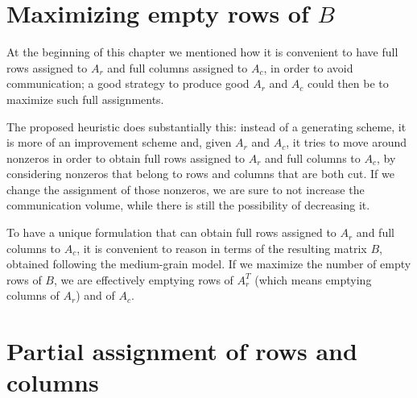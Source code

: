 \section{Maximizing empty rows of $B$} \label{sec:globalview}

At the beginning of this chapter we mentioned how it is convenient to have full rows assigned to $A_r$ and full columns assigned to $A_c$, in order to avoid communication; a good strategy to produce good $A_r$ and $A_c$ could then be to maximize such full assignments.

The proposed heuristic does substantially this: instead of a generating scheme, it is more of an improvement scheme and, given $A_r$ and $A_c$, it tries to move around nonzeros in order to obtain full rows assigned to $A_r$ and full columns to $A_c$, by considering nonzeros that belong to rows and columns that are both cut. If we change the assignment of those nonzeros, we are sure to not increase the communication volume, while there is still the possibility of decreasing it. 

To have a unique formulation that can obtain full rows assigned to $A_r$ and full columns to $A_c$, it is convenient to reason in terms of the resulting matrix $B$, obtained following the medium-grain model. If we maximize the number of empty rows of $B$, we are effectively emptying rows of $A_r^T$ (which means emptying columns of $A_r$) and of $A_c$. 

\section{Partial assignment of rows and columns} \label{sec:hot_restart}
